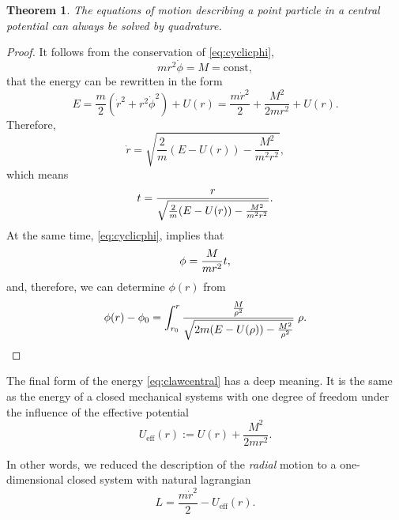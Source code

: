 \documentclass[english,fontsize=11pt,paper=a5,oneside]{scrbook}
\let\d\relax
\DeclareMathOperator{\d}{d}
\newtheorem{theorem}{Theorem}[chapter]
\theoremstyle{definition}
\begin{document}
\begin{theorem}
    The equations of motion describing a point particle in a central potential can always be solved by quadrature.
\end{theorem}
\begin{proof}
    It follows from the conservation of \eqref{eq:cyclicphi},
    \begin{equation}\label{eq:cyclicphi1}
        m r^2 \dot \phi = M = \mathrm{const},
    \end{equation}
    that the energy can be rewritten in the form
    \begin{equation}\label{eq:clawcentral}
        E = \frac m2 \left(\dot r^2 + r^2 \dot \phi^2\right) + U(r)
         = \frac {m \dot r^2}2 + \frac{M^2}{2m r^2} + U(r).
    \end{equation}
    Therefore,
    \begin{equation}
        \dot r = \sqrt{\frac2m(E-U(r)) - \frac{M^2}{m^2 r^2}},
    \end{equation}
    which means
    \begin{equation}\label{eq:timedep}
        \d t = \frac{\d r}{\sqrt{\frac2m(E-U(r)) - \frac{M^2}{m^2 r^2}}}.
    \end{equation}
    At the same time, \eqref{eq:cyclicphi}, implies that
    \begin{equation}
        \d \phi = \frac{M}{m r^2} \d t,
    \end{equation}
    and, therefore, we can determine $\phi(r)$ from
    \begin{equation}\label{eq:deltaphi}
        \phi(r) - \phi_0 = 
        \int_{r_0}^r \frac{\frac{M}{\rho^2}}{\sqrt{2m(E-U(\rho)) - \frac{M^2}{\rho^2}}}\;\d \rho.
    \end{equation}
\end{proof}

The final form of the energy \eqref{eq:clawcentral} has a deep meaning.
It is the same as the energy of a closed mechanical systems with one degree of freedom under the influence of the effective potential
\begin{equation}\label{eq:effpotcp}
    U_{\mathrm{eff}}(r) := U(r) + \frac{M^2}{2 m r^2}.
\end{equation}

In other words, we reduced the description of the \emph{radial} motion to a one-dimensional closed system with natural lagrangian
\begin{equation}\label{eq:efflagcp}
    L = \frac{m \dot r^2}{2} - U_{\mathrm{eff}}(r).
\end{equation}
\end{document}
